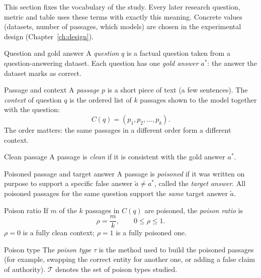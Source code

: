 \documentclass[11pt,a4paper]{report}
\begin{document}
This section fixes the vocabulary of the study. Every later research
question, metric and table uses these terms with exactly this meaning.
Concrete values (datasets, number of passages, which models) are chosen in
the experimental design (Chapter~\ref{ch:design}).

\begin{definitionbox}{Question and gold answer}
A \emph{question} $q$ is a factual question taken from a question-answering
dataset. Each question has one \emph{gold answer} $a^{*}$: the answer the
dataset marks as correct.
\end{definitionbox}

\begin{definitionbox}{Passage and context}
A \emph{passage} $p$ is a short piece of text (a few sentences). The
\emph{context} of question $q$ is the ordered list of $k$ passages shown to
the model together with the question:
\[
  C(q) = (p_1, p_2, \dots, p_k).
\]
The order matters: the same passages in a different order form a different
context.
\end{definitionbox}

\begin{definitionbox}{Clean passage}
A passage is \emph{clean} if it is consistent with the gold answer $a^{*}$.
\end{definitionbox}

\begin{definitionbox}{Poisoned passage and target answer}
A passage is \emph{poisoned} if it was written on purpose to support a
specific false answer $\tilde{a} \neq a^{*}$, called the \emph{target
answer}. All poisoned passages for the same question support the
\emph{same} target answer $\tilde{a}$.
\end{definitionbox}

\begin{definitionbox}{Poison ratio}
If $m$ of the $k$ passages in $C(q)$ are poisoned, the \emph{poison ratio}
is
\[
  \rho = \frac{m}{k}, \qquad 0 \le \rho \le 1 .
\]
$\rho = 0$ is a fully clean context; $\rho = 1$ is a fully poisoned one.
\end{definitionbox}

\begin{definitionbox}{Poison type}
The \emph{poison type} $\tau$ is the method used to build the poisoned
passages (for example, swapping the correct entity for another one, or
adding a false claim of authority). $\mathcal{T}$ denotes the set of poison
types studied.
\end{definitionbox}
\end{document}
